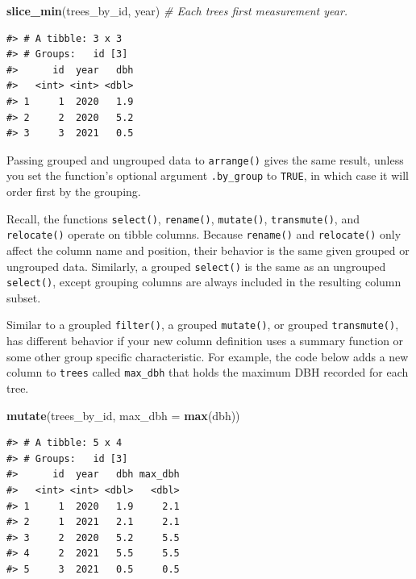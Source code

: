 \documentclass[
  11pt,
]{krantz}
\newenvironment{Shaded}{\begin{snugshade}}{\end{snugshade}}
\newcommand{\CommentTok}[1]{\textcolor[rgb]{0.56,0.35,0.01}{\textit{#1}}}
\newcommand{\DataTypeTok}[1]{\textcolor[rgb]{0.13,0.29,0.53}{#1}}
\newcommand{\KeywordTok}[1]{\textcolor[rgb]{0.13,0.29,0.53}{\textbf{#1}}}
\newcommand{\NormalTok}[1]{#1}
\theoremstyle{definition}
\theoremstyle{definition}
\theoremstyle{definition}
\theoremstyle{definition}
\theoremstyle{remark}
\begin{document}
\begin{Shaded}
\begin{Highlighting}[]
\KeywordTok{slice\_min}\NormalTok{(trees\_by\_id, year) }\CommentTok{\# Each tree\textquotesingle{}s first measurement year.}
\end{Highlighting}
\end{Shaded}

\begin{verbatim}
#> # A tibble: 3 x 3
#> # Groups:   id [3]
#>      id  year   dbh
#>   <int> <int> <dbl>
#> 1     1  2020   1.9
#> 2     2  2020   5.2
#> 3     3  2021   0.5
\end{verbatim}

Passing grouped and ungrouped data to \texttt{arrange()} gives the same result, unless you set the function's optional argument \texttt{.by\_group} to \texttt{TRUE}, in which case it will order first by the grouping.

Recall, the functions \texttt{select()}, \texttt{rename()}, \texttt{mutate()}, \texttt{transmute()}, and \texttt{relocate()} operate on tibble columns. Because \texttt{rename()} and \texttt{relocate()} only affect the column name and position, their behavior is the same given grouped or ungrouped data. Similarly, a grouped \texttt{select()} is the same as an ungrouped \texttt{select()}, except grouping columns are always included in the resulting column subset.

Similar to a groupled \texttt{filter()}, a grouped \texttt{mutate()}, or grouped \texttt{transmute()}, has different behavior if your new column definition uses a summary function or some other group specific characteristic. For example, the code below adds a new column to \texttt{trees} called \texttt{max\_dbh} that holds the maximum DBH recorded for each tree.

\begin{Shaded}
\begin{Highlighting}[]
\KeywordTok{mutate}\NormalTok{(trees\_by\_id, }\DataTypeTok{max\_dbh =} \KeywordTok{max}\NormalTok{(dbh))}
\end{Highlighting}
\end{Shaded}

\begin{verbatim}
#> # A tibble: 5 x 4
#> # Groups:   id [3]
#>      id  year   dbh max_dbh
#>   <int> <int> <dbl>   <dbl>
#> 1     1  2020   1.9     2.1
#> 2     1  2021   2.1     2.1
#> 3     2  2020   5.2     5.5
#> 4     2  2021   5.5     5.5
#> 5     3  2021   0.5     0.5
\end{verbatim}
\end{document}
